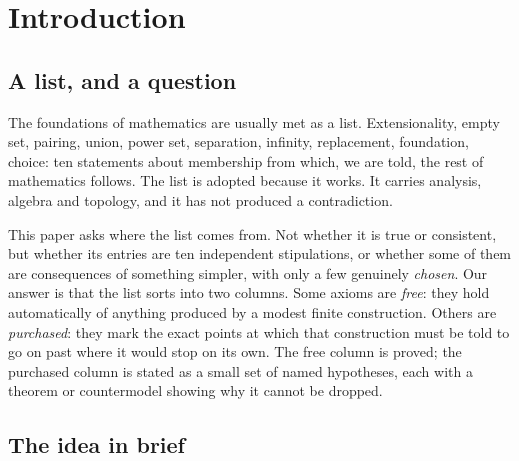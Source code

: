 \section{Introduction}\label{sec:intro}

\subsection{A list, and a question}

The foundations of mathematics are usually met as a list. Extensionality, empty set, pairing,
union, power set, separation, infinity, replacement, foundation, choice: ten statements about
membership \citep{Zermelo1908, Fraenkel1922} from which, we are told, the rest of mathematics
follows. The list is adopted because it works. It carries analysis, algebra and topology, and it
has not produced a contradiction.

This paper asks where the list comes from. Not whether it is true or consistent, but whether its
entries are ten independent stipulations, or whether some of them are consequences of something
simpler, with only a few genuinely \emph{chosen}. Our answer is that the list sorts into two
columns. Some axioms are \emph{free}: they hold automatically of anything produced by a modest
finite construction. Others are \emph{purchased}: they mark the exact points at which that
construction must be told to go on past where it would stop on its own. The free column is
proved; the purchased column is stated as a small set of named hypotheses, each with a theorem
or countermodel showing why it cannot be dropped.

\subsection{The idea in brief}

